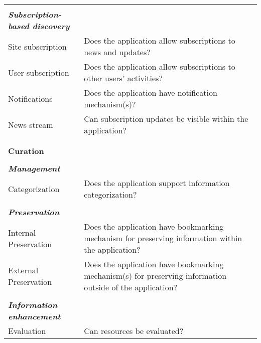 \documentclass{casconpaper}
\begin{document}
{\begin{table*}[htbp]
\begin{tabular}{|p{0.30\linewidth}|p{0.70\linewidth}|}
&\\
\emph{\textbf{Subscription-based discovery}}          &                                                                                                           \\
Site subscription            & Does the application allow subscriptions to news and updates?                                             \\
User subscription             & Does the application allow subscriptions to other users' activities?                                      \\
Notifications                & Does the application have notification mechanism(s)?                                                      \\
News stream                  & Can subscription updates be visible within the application?  \\
&\\
\hline     
&\\                                        
\textbf{\large{Curation}}                     &                                                                                                        \\
&\\        
\emph{\textbf{Management}}                    &                                                                                                           \\
Categorization               & Does the application support information categorization?                                                  \\
&\\
\emph{\textbf{Preservation}}                   &                                                                                                           \\
Internal Preservation        & Does the application have bookmarking mechanism for preserving information within the application?        \\
External Preservation        & Does the application have bookmarking mechanism(s) for preserving information outside of the application? \\
&\\
\emph{\textbf{Information enhancement}}            &                                                                                                           \\
Evaluation                   & Can resources be evaluated?                                                                               \\

\end{tabular}
\end{table*}}
\end{document}
